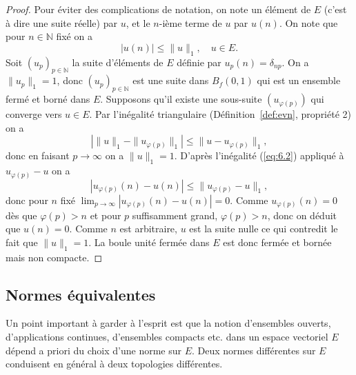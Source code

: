 \documentclass{article}
\begin{document}
\begin{proof}
Pour éviter des complications de notation, on note un élément de $E$ (c'est à dire une suite réelle) par $u$, et le $n$-ième terme de $u$ par $u(n)$. On note que pour $n \in \mathbb{N}$ fixé on a
\begin{equation}
    |u(n)| \leq \|u\|_1, \quad u \in E.
\end{equation}
Soit $(u_p)_{p \in \mathbb{N}}$ la suite d'éléments de $E$ définie par $u_p(n) = \delta_{np}$. On a $\|u_p\|_1 = 1$, donc $(u_p)_{p \in \mathbb{N}}$ est une suite dans $B_f(0, 1)$ qui est un ensemble fermé et borné dans $E$. Supposons qu'il existe une sous-suite $(u_{\varphi(p)})$ qui converge vers $u \in E$. Par l'inégalité triangulaire (Définition~\ref{def:evn}, propriété 2) on a
\begin{equation}
    |\|u\|_1 - \|u_{\varphi(p)}\|_1| \leq \|u - u_{\varphi(p)}\|_1,
\end{equation}
donc en faisant $p \rightarrow \infty$ on a $\|u\|_1 = 1$. D'après l'inégalité (\ref{eq:6.2}) appliqué à $u_{\varphi(p)} - u$ on a
\begin{equation}
    |u_{\varphi(p)}(n) - u(n)| \leq \|u_{\varphi(p)} - u\|_1,
\end{equation}
donc pour $n$ fixé $\lim_{p \rightarrow \infty} |u_{\varphi(p)}(n) - u(n)| = 0$. Comme $u_{\varphi(p)}(n) = 0$ dès que $\varphi(p) > n$ et pour $p$ suffisamment grand, $\varphi(p) > n$, donc on déduit que $u(n) = 0$. Comme $n$ est arbitraire, $u$ est la suite nulle ce qui contredit le fait que $\|u\|_1 = 1$. La boule unité fermée dans $E$ est donc fermée et bornée mais non compacte.
\end{proof}

\subsection{Normes équivalentes}

Un point important à garder à l'esprit est que la notion d'ensembles ouverts, d'applications continues, d'ensembles compacts etc. dans un espace vectoriel $E$ dépend a priori du choix d'une norme sur $E$. Deux normes différentes sur $E$ conduisent en général à deux topologies différentes.
\end{document}
